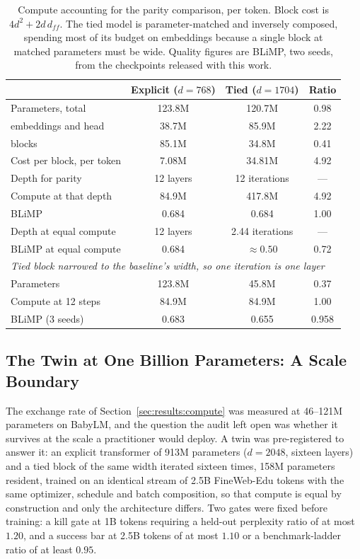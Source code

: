 \begin{table}[t]
\centering
\caption{Compute accounting for the parity comparison, per token. Block cost is
$4d^2 + 2 d\,d_{ff}$. The tied model is parameter-matched and inversely composed,
spending most of its budget on embeddings because a single block at matched
parameters must be wide. Quality figures are BLiMP, two seeds, from the
checkpoints released with this work.}
\label{tab:compute}
\begin{tabular}{lccc}
\toprule
 & Explicit ($d=768$) & Tied ($d=1704$) & Ratio \\
\midrule
Parameters, total          & 123.8M & 120.7M & 0.98 \\
\quad embeddings and head  & 38.7M  & 85.9M  & 2.22 \\
\quad blocks               & 85.1M  & 34.8M  & 0.41 \\
Cost per block, per token  & 7.08M  & 34.81M & 4.92 \\
\midrule
Depth for parity           & 12 layers & 12 iterations & --- \\
Compute at that depth      & 84.9M  & 417.8M & 4.92 \\
BLiMP                      & 0.684  & 0.684  & 1.00 \\
\midrule
Depth at equal compute     & 12 layers & 2.44 iterations & --- \\
BLiMP at equal compute     & 0.684  & $\approx 0.50$ & 0.72 \\
\midrule
\multicolumn{4}{l}{\emph{Tied block narrowed to the baseline's width, so one iteration is one layer}} \\
Parameters                 & 123.8M & 45.8M  & 0.37 \\
Compute at 12 steps        & 84.9M  & 84.9M  & 1.00 \\
BLiMP (3 seeds)            & 0.683  & 0.655  & 0.958 \\
\bottomrule
\end{tabular}
\end{table}

\subsection{The Twin at One Billion Parameters: A Scale Boundary}
\label{sec:results:twin}

The exchange rate of Section~\ref{sec:results:compute} was measured at 46--121M
parameters on BabyLM, and the question the audit left open was whether it
survives at the scale a practitioner would deploy. A twin was pre-registered to
answer it: an explicit transformer of 913M parameters ($d = 2048$, sixteen
layers) and a tied block of the same width iterated sixteen times, 158M
parameters resident, trained on an identical stream of 2.5B FineWeb-Edu tokens
with the same optimizer, schedule and batch composition, so that compute is
equal by construction and only the architecture differs. Two gates were fixed
before training: a kill gate at 1B tokens requiring a held-out perplexity ratio
of at most $1.20$, and a success bar at 2.5B tokens of at most $1.10$ or a
benchmark-ladder ratio of at least $0.95$.

